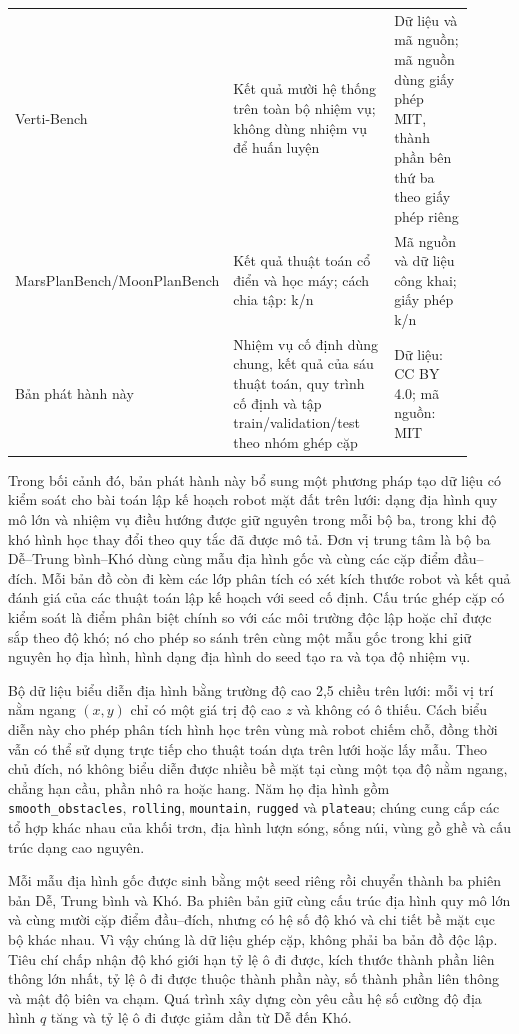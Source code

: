 \documentclass[11pt]{article}
\begin{document}
{\begin{longtable}{L{0.18\linewidth} L{0.44\linewidth} L{0.29\linewidth}}
    Verti-Bench \cite{vertibench} & Kết quả mười hệ thống trên toàn bộ nhiệm vụ;
    không dùng nhiệm vụ để huấn luyện & Dữ liệu và mã nguồn; mã nguồn dùng giấy phép MIT, thành phần
    bên thứ ba theo giấy phép riêng \\
    MarsPlanBench/\newline MoonPlanBench \cite{planetarypathbench} & Kết quả thuật toán cổ điển và học
    máy; cách chia tập: k/n & Mã nguồn và dữ liệu công khai; giấy phép k/n \\
    Bản phát hành này & Nhiệm vụ cố định dùng chung, kết quả của sáu thuật toán,
    quy trình cố định và tập train/validation/test theo nhóm ghép cặp & Dữ liệu:
    CC BY 4.0; mã nguồn: MIT \\
  \end{longtable}
}

Trong bối cảnh đó, bản phát hành này bổ sung một phương pháp tạo dữ liệu có
kiểm soát cho bài toán lập kế hoạch robot mặt đất trên lưới: dạng địa hình
quy mô lớn và nhiệm vụ điều hướng được giữ nguyên trong mỗi bộ ba, trong khi độ
khó hình học thay đổi theo quy tắc đã được mô tả. Đơn vị trung tâm là bộ ba
Dễ--Trung bình--Khó dùng cùng mẫu địa hình gốc và cùng các cặp điểm đầu--đích.
Mỗi bản đồ còn đi kèm các lớp phân tích có xét kích thước robot và kết quả đánh
giá của các thuật toán lập kế hoạch với seed cố định. Cấu trúc ghép cặp có kiểm soát là điểm
phân biệt chính so với các môi trường độc lập hoặc chỉ được sắp theo độ khó; nó
cho phép so sánh trên cùng một mẫu gốc trong khi giữ nguyên họ địa hình, hình
dạng địa hình do seed tạo ra và tọa độ nhiệm vụ.

Bộ dữ liệu biểu diễn địa hình bằng trường độ cao 2,5 chiều trên lưới: mỗi vị trí
nằm ngang $(x,y)$ chỉ có một giá trị độ cao $z$ và không có ô thiếu. Cách biểu
diễn này cho phép phân tích hình học trên vùng mà robot chiếm chỗ,
đồng thời vẫn có thể sử dụng trực tiếp cho thuật toán dựa trên lưới hoặc lấy
mẫu. Theo chủ đích,
nó không biểu diễn được nhiều bề mặt tại cùng một tọa độ nằm ngang, chẳng hạn
cầu, phần nhô ra hoặc hang. Năm họ địa hình gồm
\texttt{smooth\_obstacles}, \texttt{rolling}, \texttt{mountain},
\texttt{rugged} và \texttt{plateau}; chúng cung cấp các tổ hợp khác nhau của
khối trơn, địa hình lượn sóng, sống núi, vùng gồ ghề và cấu trúc dạng cao nguyên.

Mỗi mẫu địa hình gốc được sinh bằng một seed riêng rồi chuyển thành ba phiên bản
Dễ, Trung bình và Khó. Ba phiên bản giữ cùng cấu trúc địa hình quy mô lớn và
cùng mười cặp điểm đầu--đích, nhưng có hệ số độ khó và chi tiết bề mặt cục bộ
khác nhau. Vì vậy chúng là dữ liệu ghép cặp, không phải ba bản đồ độc lập. Tiêu
chí chấp nhận độ khó giới hạn tỷ lệ ô đi được, kích thước thành phần liên thông
lớn nhất, tỷ lệ ô đi được thuộc thành phần này, số thành phần liên
thông và mật độ biên va chạm. Quá trình xây dựng còn yêu cầu hệ số cường độ
địa hình $q$ tăng và tỷ lệ ô đi được giảm dần từ Dễ đến Khó.
\end{document}
